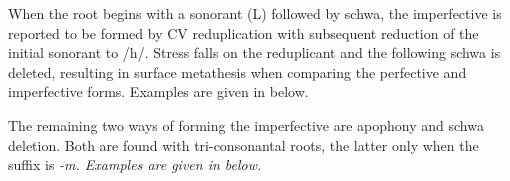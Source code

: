 When the root begins with a sonorant (L) followed by schwa,
the imperfective is reported to be formed by CV reduplication
with subsequent reduction of the initial sonorant to /h/.
Stress falls on the reduplicant and the following schwa is deleted,
resulting in surface metathesis when comparing the perfective and imperfective forms.
Examples are given in  below.

\begin{exe}
	\label{ex:HalRed2}
\end{exe}

The remaining two ways of forming the imperfective
are apophony and schwa deletion.
Both are found with tri-consonantal roots,
the latter only when the suffix is \it{-m}.
Examples are given in  below.

\begin{exe}
	\label{ex:HalApo}
\end{exe}

